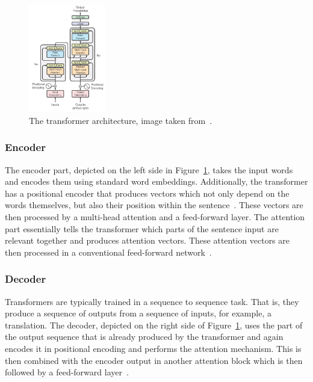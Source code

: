 \documentclass[acmsmall,nonacm]{acmart}
\begin{document}
\begin{figure}[h]
  \includegraphics[width=0.3\textwidth]{assets/transformer_architecture.jpg}
  \caption{The transformer architecture, image taken from~\cite{attention-vaswani2017}.}
  \label{fig:transformer}
\end{figure}


\subsubsection{Encoder}
The encoder part, depicted on the left side in Figure~\ref{fig:transformer}, 
takes the input words and encodes them using standard word embeddings.
Additionally, the transformer has a positional encoder that produces vectors which not only depend on the words themselves, but also their position within the sentence~\cite{attention-vaswani2017}. These vectors are then processed by a multi-head attention and a feed-forward layer. The attention part essentially tells the transformer which parts of the sentence input are relevant together and produces attention vectors. These attention vectors are then processed in a conventional feed-forward network~\cite{attention-vaswani2017}.

\subsubsection{Decoder}
Transformers are typically trained in a sequence to sequence task. That is, they produce a sequence of outputs from a sequence of inputs, for example, a translation. The decoder, depicted on the right side of Figure~\ref{fig:transformer}, uses the part of the output sequence that is already produced by the transformer and again encodes it in positional encoding and performs the attention mechanism. This is then combined with the encoder output in another attention block which is then followed by a feed-forward layer~\cite{attention-vaswani2017}.
\end{document}
